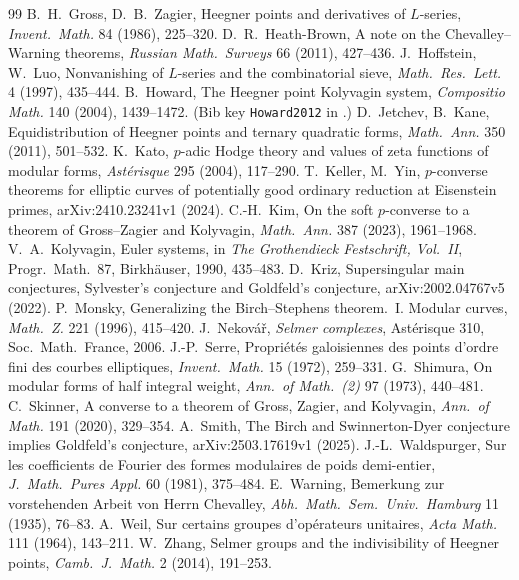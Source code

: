 \documentclass[11pt]{article}
\theoremstyle{remark}
\begin{document}
\begin{thebibliography}{99}
 B.~H.~Gross, D.~B.~Zagier, Heegner points and
derivatives of $L$-series, \emph{Invent.\ Math.} 84 (1986), 225--320.
 D.~R.~Heath-Brown, A note on the
Chevalley--Warning theorems, \emph{Russian Math.\ Surveys} 66 (2011), 427--436.
 J.~Hoffstein, W.~Luo, Nonvanishing of $L$-series and
the combinatorial sieve, \emph{Math.\ Res.\ Lett.} 4 (1997), 435--444.
 B.~Howard, The Heegner point Kolyvagin system,
\emph{Compositio Math.} 140 (2004), 1439--1472. (Bib key \texttt{Howard2012}
in \cite{P2C}.)
 D.~Jetchev, B.~Kane, Equidistribution of Heegner
points and ternary quadratic forms, \emph{Math.\ Ann.} 350 (2011), 501--532.
 K.~Kato, $p$-adic Hodge theory and values of zeta functions
of modular forms, \emph{Ast\'erisque} 295 (2004), 117--290.
 T.~Keller, M.~Yin, $p$-converse theorems for elliptic
curves of potentially good ordinary reduction at Eisenstein primes,
arXiv:2410.23241v1 (2024).
 C.-H.~Kim, On the soft $p$-converse to a theorem
of Gross--Zagier and Kolyvagin, \emph{Math.\ Ann.} 387 (2023), 1961--1968.
 V.~A.~Kolyvagin, Euler systems, in \emph{The
Grothendieck Festschrift, Vol.\ II}, Progr.\ Math.\ 87, Birkh\"auser, 1990,
435--483.
 D.~Kriz, Supersingular main conjectures, Sylvester's
conjecture and Goldfeld's conjecture, arXiv:2002.04767v5 (2022).
 P.~Monsky, Generalizing the Birch--Stephens theorem.\ I.
Modular curves, \emph{Math.\ Z.} 221 (1996), 415--420.
 J.~Nekov\'a\v{r}, \emph{Selmer complexes},
Ast\'erisque 310, Soc.\ Math.\ France, 2006.
 J.-P.~Serre, Propri\'et\'es galoisiennes des points d'ordre
fini des courbes elliptiques, \emph{Invent.\ Math.} 15 (1972), 259--331.
 G.~Shimura, On modular forms of half integral
weight, \emph{Ann.\ of Math.\ (2)} 97 (1973), 440--481.
 C.~Skinner, A converse to a theorem of Gross, Zagier, and
Kolyvagin, \emph{Ann.\ of Math.} 191 (2020), 329--354.
 A.~Smith, The Birch and Swinnerton-Dyer conjecture implies
Goldfeld's conjecture, arXiv:2503.17619v1 (2025).
 J.-L.~Waldspurger, Sur les coefficients de Fourier des
formes modulaires de poids demi-entier, \emph{J.\ Math.\ Pures Appl.} 60
(1981), 375--484.
 E.~Warning, Bemerkung zur vorstehenden Arbeit von Herrn
Chevalley, \emph{Abh.\ Math.\ Sem.\ Univ.\ Hamburg} 11 (1935), 76--83.
 A.~Weil, Sur certains groupes d'op\'erateurs unitaires,
\emph{Acta Math.} 111 (1964), 143--211.
 W.~Zhang, Selmer groups and the indivisibility of
Heegner points, \emph{Camb.\ J.\ Math.} 2 (2014), 191--253.
\end{thebibliography}
\end{document}
